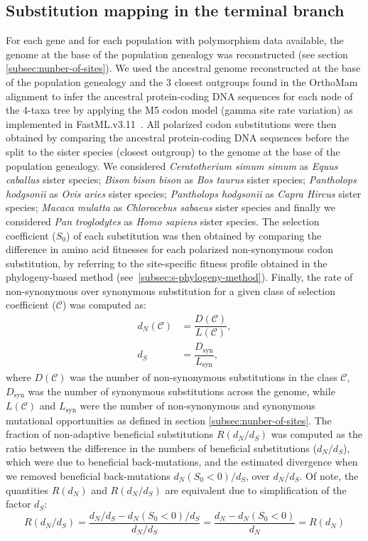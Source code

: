 \documentclass{article}
\newcommand{\dn}{d_N}
\newcommand{\ds}{d_S}
\newcommand{\dnds}{\dn / \ds}
\newcommand{\Sphy}{S_{0}}
\newcommand{\Sphyclass}{\mathcal{C}}
\begin{document}
    \subsection{Substitution mapping in the terminal branch}
    \label{subsec:substitution-mapping-in-the-terminal-branch}
    For each gene and for each population with polymorphism data available, the genome at the base of the population genealogy was reconstructed (see section \ref{subsec:nunber-of-sites}).
    We used the ancestral genome reconstructed at the base of the population genealogy and the $3$ closest outgroups found in the OrthoMam alignment to infer the ancestral protein-coding DNA sequences for each node of the 4-taxa tree by applying the M5 codon model (gamma site rate variation) as implemented in FastML.v3.11~\cite{ashkenazy_fastml_2012}.
    All polarized codon substitutions were then obtained by comparing the ancestral protein-coding DNA sequences before the split to the sister species (closest outgroup) to the genome at the base of the population genealogy.
    We considered \textit{Ceratotherium simum simum} as \textit{Equus caballus} sister species; \textit{Bison bison bison} as \textit{Bos taurus} sister species; \textit{Pantholops hodgsonii} as \textit{Ovis aries} sister species; \textit{Pantholops hodgsonii} as \textit{Capra Hircus} sister species; \textit{Macaca mulatta} as \textit{Chlorocebus sabaeus} sister species and finally we considered \textit{Pan troglodytes} as \textit{Homo sapiens} sister species.
    The selection coefficient ($\Sphy$) of each substitution was then obtained by comparing the difference in amino acid fitnesses for each polarized non-synonymous codon substitution, by referring to the site-specific fitness profile obtained in the phylogeny-based method (see~\ref{subsec:s-phylogeny-method}).
    Finally, the rate of non-synonymous over synonymous substitution for a given class of selection coefficient ($\Sphyclass$) was computed as:
    \begin{align}
        \dn \left( \Sphyclass \right) &= \dfrac{D\left( \Sphyclass \right)}{L \left( \Sphyclass \right)}, \\
        \ds &= \dfrac{D_{\textrm{syn}}}{L_{\textrm{syn}}},
    \end{align}
    where $D \left( \Sphyclass \right) $ was the number of non-synonymous substitutions in the class $\Sphyclass$, $D_{\textrm{syn}}$ was the number of synonymous substitutions across the genome, while $L \left( \Sphyclass \right)$ and $L_{\textrm{syn}}$ were the number of non-synonymous and synonymous mutational opportunities as defined in section \ref{subsec:nunber-of-sites}.
    The fraction of non-adaptive beneficial substitutions $R(\dnds)$ was computed as the ratio between the difference in the numbers of beneficial substitutions ($\dnds$), which were due to beneficial back-mutations, and the estimated divergence when we removed beneficial back-mutations $\dn (\Sphy < 0) / \ds$, over $\dnds$.
    Of note, the quantities $R(\dn)$ and $R(\dnds)$ are equivalent due to simplification of the factor $\ds$:
    \begin{equation}
        R(\dnds) = \dfrac{\dnds - \dn(\Sphy < 0) / \ds}{\dnds} = \dfrac{\dn - \dn(\Sphy < 0)}{\dn} = R(\dn)
    \end{equation}
\end{document}
